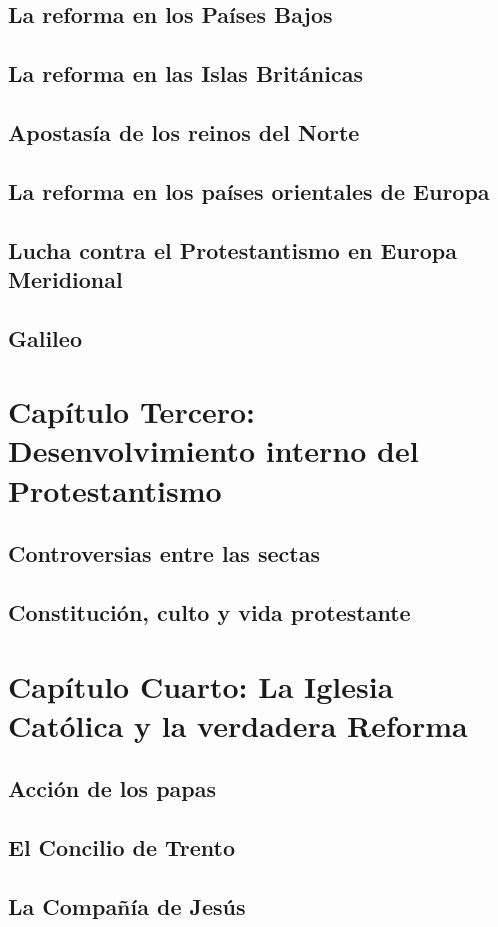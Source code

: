 \raggedbottom{} \documentclass[12pt, a4paper]{book}
\begin{document}
\section{La reforma en los Países Bajos}
\section{La reforma en las Islas Británicas}
\section{Apostasía de los reinos del Norte}
\section{La reforma en los países orientales de Europa}
\section{Lucha contra el Protestantismo en Europa Meridional}
\section{Galileo}
\chapter{Capítulo Tercero: Desenvolvimiento interno del Protestantismo}
\section{Controversias entre las sectas}
\section{Constitución, culto y vida protestante}
\chapter{Capítulo Cuarto: La Iglesia Católica y la verdadera Reforma}
\section{Acción de los papas}
\section{El Concilio de Trento}
\section{La Compañía de Jesús}
\end{document}
